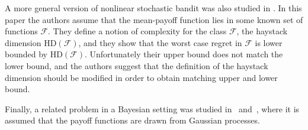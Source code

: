\documentclass[11pt]{hackednow}
\newcommand{\cF}{\mathcal{F}}
\begin{document}
A more general version of nonlinear stochastic bandit was also studied in \cite{AKS11}. In this paper the authors assume that the mean-payoff function lies in some known set of functions $\cF$. They define a notion of complexity for the class $\cF$, the haystack dimension $\mathrm{HD}(\cF)$, and they show that the worst case regret in $\cF$ is lower bounded by $\mathrm{HD}(\cF)$. Unfortunately their upper bound does not match the lower bound, and the authors suggest that the definition of the haystack dimension should be modified in order to obtain matching upper and lower bound.

Finally, a related problem in a Bayesian setting was studied in~\cite{SKKS10} and~\cite{GAOS10}, where it is assumed that the payoff functions are drawn from Gaussian processes.

%
%
%
%
\end{document}
